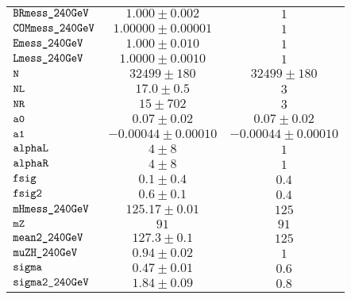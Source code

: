 \begin{tabular}{lcc}
$\verb+BRmess_240GeV+ $ & $  1.000\pm 0.002$ & $ 1$\\
$\verb+COMmess_240GeV+ $ & $  1.00000\pm 0.00001$ & $ 1$\\
$\verb+Emess_240GeV+ $ & $  1.000\pm 0.010$ & $ 1$\\
$\verb+Lmess_240GeV+ $ & $  1.0000\pm 0.0010$ & $ 1$\\
$\verb+N+ $ & $  32499\pm 180$ & $ 32499\pm 180$\\
$\verb+NL+ $ & $  17.0\pm 0.5$ & $ 3$\\
$\verb+NR+ $ & $  15\pm 702$ & $ 3$\\
$\verb+a0+ $ & $  0.07\pm 0.02$ & $ 0.07\pm 0.02$\\
$\verb+a1+ $ & $ -0.00044\pm 0.00010$ & $-0.00044\pm 0.00010$\\
$\verb+alphaL+ $ & $  4\pm 8$ & $ 1$\\
$\verb+alphaR+ $ & $  4\pm 8$ & $ 1$\\
$\verb+fsig+ $ & $  0.1\pm 0.4$ & $ 0.4$\\
$\verb+fsig2+ $ & $  0.6\pm 0.1$ & $ 0.4$\\
$\verb+mHmess_240GeV+ $ & $  125.17\pm 0.01$ & $ 125$\\
$\verb+mZ+ $ & $  91$ & $ 91$\\
$\verb+mean2_240GeV+ $ & $  127.3\pm 0.1$ & $ 125$\\
$\verb+muZH_240GeV+ $ & $  0.94\pm 0.02$ & $ 1$\\
$\verb+sigma+ $ & $  0.47\pm 0.01$ & $ 0.6$\\
$\verb+sigma2_240GeV+ $ & $  1.84\pm 0.09$ & $ 0.8$\\
\end{tabular}
